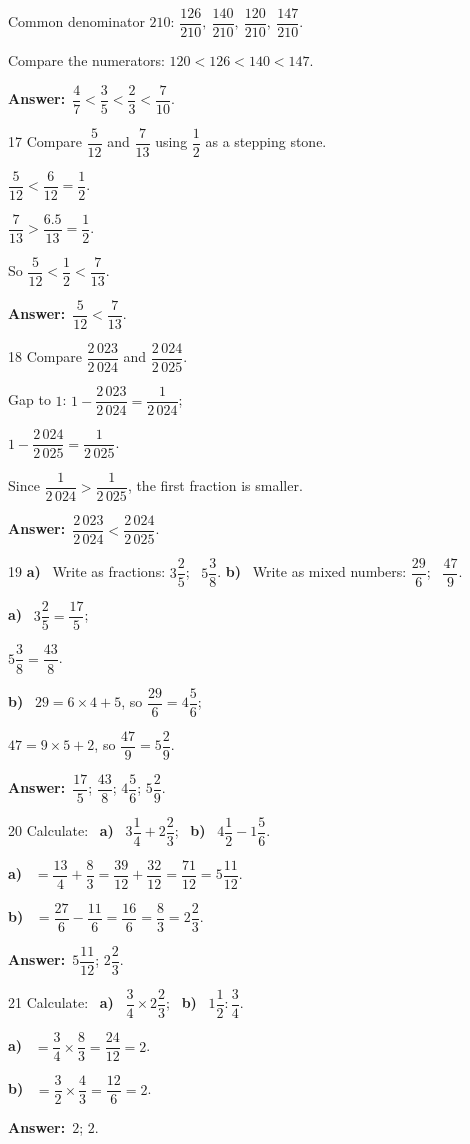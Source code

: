 \documentclass[11pt]{article}
\newif\ifsol \solfalse
\providecommand{\AnsWord}{Đáp số}
\newcommand{\dapso}[1]{\par\textbf{\AnsWord:}\ #1}
\newcommand{\probsol}[1]{%
  \begin{lrbox}{\solmeasure}\begin{minipage}{\dimexpr\linewidth-24pt\relax}#1\end{minipage}\end{lrbox}%
  \ifsol
    \begin{solbox}#1\end{solbox}%
  \else
    \setlength{\solht}{\dimexpr\ht\solmeasure+\dp\solmeasure+0.85cm\relax}%
    \ifdim\solht<1.35cm\setlength{\solht}{1.35cm}\fi
    \begin{tcolorbox}[colback=white,colframe=Line,boxrule=0.8pt,arc=5pt,
      left=8pt,right=8pt,top=4pt,bottom=4pt,height=\solht]{\footnotesize\color{Slate}\itshape\WorkWord}\end{tcolorbox}%
  \fi}
\newcommand{\pa}[1]{\textbf{#1)}\ }
\newcommand{\gap}{\vspace{0.3cm}}
\def\WorkWord{Your work:}
\def\AnsWord{Answer}
\begin{document}
\probsol{
Common denominator $210$: $\dfrac{126}{210},\ \dfrac{140}{210},\ \dfrac{120}{210},\ \dfrac{147}{210}$.\par Compare the numerators: $120<126<140<147$.
\dapso{$\dfrac47<\dfrac35<\dfrac23<\dfrac7{10}$.}}
\gap
\begin{probbox}{17}{\relax}
Compare $\dfrac5{12}$ and $\dfrac7{13}$ using $\dfrac12$ as a stepping stone.
\end{probbox}
\probsol{
$\dfrac5{12}<\dfrac6{12}=\dfrac12$.\par $\dfrac7{13}>\dfrac{6.5}{13}=\dfrac12$.\par So $\dfrac5{12}<\dfrac12<\dfrac7{13}$.
\dapso{$\dfrac5{12}<\dfrac7{13}$.}}
\gap
\begin{probbox}{18}{\relax}
Compare $\dfrac{2\,023}{2\,024}$ and $\dfrac{2\,024}{2\,025}$.
\end{probbox}
\probsol{
Gap to $1$: $1-\dfrac{2\,023}{2\,024}=\dfrac1{2\,024}$;\par $1-\dfrac{2\,024}{2\,025}=\dfrac1{2\,025}$.\par Since $\dfrac1{2\,024}>\dfrac1{2\,025}$, the first fraction is smaller.
\dapso{$\dfrac{2\,023}{2\,024}<\dfrac{2\,024}{2\,025}$.}}
\gap
\begin{probbox}{19}{\relax}
\pa{a} Write as fractions: $3\dfrac25$; \ $5\dfrac38$. \quad \pa{b} Write as mixed numbers: $\dfrac{29}6$; \ $\dfrac{47}9$.
\end{probbox}
\probsol{
\pa{a} $3\dfrac25=\dfrac{17}5$;\par $5\dfrac38=\dfrac{43}8$.\par \pa{b} $29=6\times4+5$, so $\dfrac{29}6=4\dfrac56$;\par $47=9\times5+2$, so $\dfrac{47}9=5\dfrac29$.
\dapso{$\dfrac{17}5$; $\dfrac{43}8$; $4\dfrac56$; $5\dfrac29$.}}
\gap
\begin{probbox}{20}{\relax}
Calculate: \ \pa{a} $3\dfrac14+2\dfrac23$; \ \pa{b} $4\dfrac12-1\dfrac56$.
\end{probbox}
\probsol{
\pa{a} $=\dfrac{13}4+\dfrac83=\dfrac{39}{12}+\dfrac{32}{12}=\dfrac{71}{12}=5\dfrac{11}{12}$.\par \pa{b} $=\dfrac{27}6-\dfrac{11}6=\dfrac{16}6=\dfrac83=2\dfrac23$.
\dapso{$5\dfrac{11}{12}$; $2\dfrac23$.}}
\gap
\begin{probbox}{21}{\relax}
Calculate: \ \pa{a} $\dfrac34\times2\dfrac23$; \ \pa{b} $1\dfrac12:\dfrac34$.
\end{probbox}
\probsol{
\pa{a} $=\dfrac34\times\dfrac83=\dfrac{24}{12}=2$.\par \pa{b} $=\dfrac32\times\dfrac43=\dfrac{12}6=2$.
\dapso{$2$; $2$.}}
\end{document}
